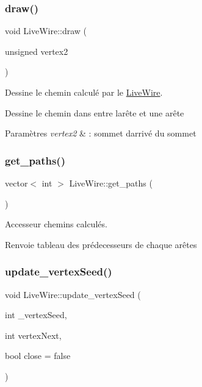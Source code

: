\subsubsection{\texorpdfstring{draw()}{draw()}}
{\footnotesize\ttfamily void Live\+Wire\+::draw (\begin{DoxyParamCaption}\item[{unsigned}]{vertex2 }\end{DoxyParamCaption})}



Dessine le chemin calculé par le \hyperlink{classLiveWire}{Live\+Wire}. 

Dessine le chemin dans  entre l\textquotesingle{}arête  et une arête 


\begin{DoxyParams}{Paramètres}
{\em vertex2} & \+: sommet d\textquotesingle{}arrivé du sommet  \\
\hline
\end{DoxyParams}
\mbox{\label{classLiveWire_a84b0d58817a209322cc11525423c2472}} 
\subsubsection{\texorpdfstring{get\+\_\+paths()}{get\_paths()}}
{\footnotesize\ttfamily vector$<$ int $>$ Live\+Wire\+::get\+\_\+paths (\begin{DoxyParamCaption}{ }\end{DoxyParamCaption})}



Accesseur chemins calculés. 

\begin{DoxyReturn}{Renvoie}
tableau des prédecesseurs de chaque arêtes 
\end{DoxyReturn}
\mbox{\label{classLiveWire_af76b35975d3b17c4c831103df2a99a41}} 
\subsubsection{\texorpdfstring{update\+\_\+vertex\+Seed()}{update\_vertexSeed()}}
{\footnotesize\ttfamily void Live\+Wire\+::update\+\_\+vertex\+Seed (\begin{DoxyParamCaption}\item[{int}]{\+\_\+vertex\+Seed,  }\item[{int}]{vertex\+Next,  }\item[{bool}]{close = {\ttfamily false} }\end{DoxyParamCaption})}




